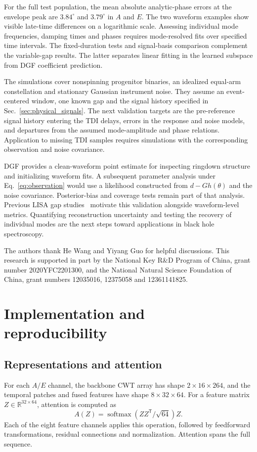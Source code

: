 \documentclass[10pt,prd,aps,a4paper,twocolumn,superscriptaddress,nofootinbib,floatfix]{revtex4-2}
\begin{document}
For the full test population, the mean absolute analytic-phase errors at the envelope peak are $3.84^\circ$ and $3.79^\circ$ in $A$ and $E$. The two waveform examples show visible late-time differences on a logarithmic scale. Assessing individual mode frequencies, damping times and phases requires mode-resolved fits over specified time intervals. The fixed-duration tests and signal-basis comparison complement the variable-gap results. The latter separates linear fitting in the learned subspace from DGF coefficient prediction.

The simulations cover nonspinning progenitor binaries, an idealized equal-arm constellation and stationary Gaussian instrument noise. They assume an event-centered window, one known gap and the signal history specified in Sec.~\ref{sec:physical_signals}. The next validation targets are the pre-reference signal history entering the TDI delays, errors in the response and noise models, and departures from the assumed mode-amplitude and phase relations. Application to missing TDI samples requires simulations with the corresponding observation and noise covariance.

DGF provides a clean-waveform point estimate for inspecting ringdown structure and initializing waveform fits. A subsequent parameter analysis under Eq.~\eqref{eq:observation} would use a likelihood constructed from $d-Gh(\theta)$ and the noise covariance. Posterior-bias and coverage tests remain part of that analysis. Previous LISA gap studies~\cite{Baghi2019,Mao:2025cae} motivate this validation alongside waveform-level metrics. Quantifying reconstruction uncertainty and testing the recovery of individual modes are the next steps toward applications in black hole spectroscopy.

\begin{acknowledgments}
The authors thank He Wang and Yiyang Guo for helpful discussions. This research is supported in part by the National Key R\&D Program of China, grant number 2020YFC2201300, and the National Natural Science Foundation of China, grant numbers 12035016, 12375058 and 12361141825.

\end{acknowledgments}
\clearpage
\appendix
\section{Implementation and reproducibility}\label{app:model_analysis}
\subsection{Representations and attention}
For each $A/E$ channel, the backbone CWT array has shape $2\times16\times264$, and the temporal patches and fused features have shape $8\times32\times64$. For a feature matrix $Z\in\mathbb R^{32\times64}$, attention is computed as
\begin{equation}
A(Z)=\operatorname{softmax}(ZZ^{\mathsf T}/\sqrt{64})Z.
\end{equation}
Each of the eight feature channels applies this operation, followed by feedforward transformations, residual connections and normalization. Attention spans the full sequence.
\end{document}
